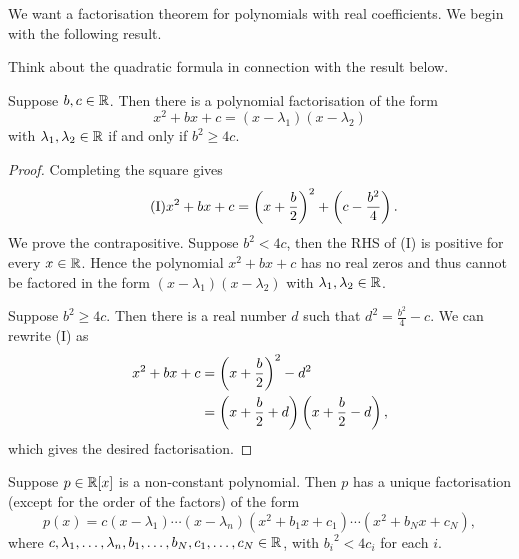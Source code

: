 We want a factorisation theorem for polynomials with real coefficients. We begin with the following result.

\begin{remark}
Think about the quadratic formula in connection with the result below.
\end{remark}

\begin{lemma}
Suppose $b,c\in\mathbb R$. Then there is a polynomial factorisation of the form
\[x^2+bx+c=(x-\lambda_1)(x-\lambda_2)\]
with $\lambda_1,\lambda_2\in\mathbb R$ if and only if $b^2\ge 4c$.
\end{lemma}

\begin{proof}
Completing the square gives
\begin{equation*}\tag{I}
x^2+bx+c=\left(x+\frac{b}{2}\right)^2+\left(c-\frac{b^2}{4}\right).
\end{equation*}
\fbox{$\implies$} We prove the contrapositive. Suppose $b^2<4c$, then the RHS of (I) is positive for every $x\in\mathbb R$. Hence the polynomial $x^2+bx+c$ has no real zeros and thus cannot be factored in the form $(x-\lambda_1)(x-\lambda_2)$ with $\lambda_1,\lambda_2\in\mathbb R$.

\fbox{$\impliedby$} Suppose $b^2\ge4c$. 
Then there is a real number $d$ such that $d^2=\frac{b^2}{4}-c$. 
We can rewrite (I) as
\begin{align*}
x^2+bx+c&=\left(x+\frac{b}{2}\right)^2-d^2\\
&=\left(x+\frac{b}{2}+d\right)\left(x+\frac{b}{2}-d\right),
\end{align*}
which gives the desired factorisation.
\end{proof}

\begin{theorem}\label{thrm:factorisation-polynomial-R}
Suppose $p\in\mathbb R[x]$ is a non-constant polynomial. Then $p$ has a unique factorisation (except for the order of the factors) of the form
\[p(x)=c(x-\lambda_1)\cdots(x-\lambda_n)(x^2+b_1x+c_1)\cdots(x^2+b_Nx+c_N),\]
where $c,\lambda_1,\dots,\lambda_n,b_1,\dots,b_N,c_1,\dots,c_N\in\mathbb R$, with ${b_i}^2<4c_i$ for each $i$.
\end{theorem}